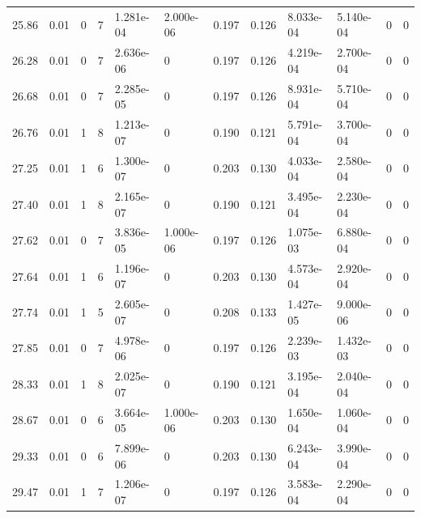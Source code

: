 \documentclass[preview]{standalone}
\begin{document}
{{{\begin{tabular}{L{1.2cm}C{1.2cm} C{0.3cm}C{0.5cm} C{1.4cm}C{1.4cm} C{1.4cm}C{1.4cm} C{1.6cm}C{1.6cm} C{1.6cm}C{1.6cm}}
  25.86  &  0.01  & 0     &  7 &  1.281e-04  & 2.000e-06  &  0.197&   0.126& 8.033e-04 & 5.140e-04   &  0 & 0  \\ 
  26.28  &  0.01  & 0     &  7 &  2.636e-06  & 0  &  0.197&   0.126& 4.219e-04 & 2.700e-04   &  0 & 0  \\ 
  26.68  &  0.01  & 0     &  7 &  2.285e-05  & 0  &  0.197&   0.126& 8.931e-04 & 5.710e-04   &  0 & 0  \\ 
  26.76  &  0.01  & 1     &  8 &  1.213e-07  & 0  &  0.190&   0.121& 5.791e-04 & 3.700e-04   &  0 & 0  \\ 
  27.25  &  0.01  & 1     &  6 &  1.300e-07  & 0  &  0.203&   0.130& 4.033e-04 & 2.580e-04   &  0 & 0  \\ 
  27.40  &  0.01  & 1     &  8 &  2.165e-07  & 0  &  0.190&   0.121& 3.495e-04 & 2.230e-04   &  0 & 0  \\ 
  27.62  &  0.01  & 0     &  7 &  3.836e-05  & 1.000e-06  &  0.197&   0.126& 1.075e-03 & 6.880e-04   &  0 & 0  \\ 
  27.64  &  0.01  & 1     &  6 &  1.196e-07  & 0  &  0.203&   0.130& 4.573e-04 & 2.920e-04   &  0 & 0  \\ 
  27.74  &  0.01  & 1     &  5 &  2.605e-07  & 0  &  0.208&   0.133& 1.427e-05 & 9.000e-06   &  0 & 0  \\ 
  27.85  &  0.01  & 0     &  7 &  4.978e-06  & 0  &  0.197&   0.126& 2.239e-03 & 1.432e-03   &  0 & 0  \\ 
  28.33  &  0.01  & 1     &  8 &  2.025e-07  & 0  &  0.190&   0.121& 3.195e-04 & 2.040e-04   &  0 & 0  \\ 
  28.67  &  0.01  & 0     &  6 &  3.664e-05  & 1.000e-06  &  0.203&   0.130& 1.650e-04 & 1.060e-04   &  0 & 0  \\ 
  29.33  &  0.01  & 0     &  6 &  7.899e-06  & 0  &  0.203&   0.130& 6.243e-04 & 3.990e-04   &  0 & 0  \\ 
  29.47  &  0.01  & 1     &  7 &  1.206e-07  & 0  &  0.197&   0.126& 3.583e-04 & 2.290e-04   &  0 & 0  \\ 
\hline 
\end{tabular} 

}}}
\end{document}
